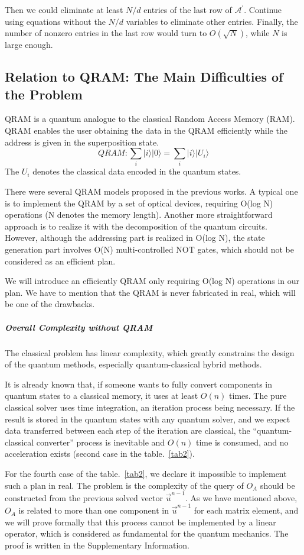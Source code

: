 \documentclass[%
 reprint,
 amsmath,amssymb,
pra,
]{revtex4-1}
\begin{document}
\begin{itemize}
Then we could eliminate at least $N/d$ entries of the last row of $\mathcal{A^{\prime}}$. Continue using equations without the $N/d$ variables to eliminate other entries. Finally, the number of nonzero entries in the last row would turn to $O(\sqrt{N})$, while $N$ is large enough.
\fi


\subsection{Relation to QRAM: The Main Difficulties of the Problem}

QRAM is a quantum analogue to the classical Random Access Memory (RAM). QRAM enables the user obtaining the data in the QRAM efficiently while the address is given in the superposition state. 
$$
QRAM: \sum_i{|i\rangle|0\rangle}=\sum_i{|i\rangle|U_i\rangle}
$$
The $U_i$ denotes the classical data encoded in the quantum states.

There were several QRAM models proposed in the previous works. A typical one is to implement the QRAM by a set of optical devices, requiring O(log N) operations (N denotes the memory length). Another more straightforward approach is to realize it with the decomposition of the quantum circuits. However, although the addressing part is realized in O(log N), the state generation part involves O(N) multi-controlled NOT gates, which should not be considered as an efficient plan.

We will introduce an efficiently QRAM only requiring O(log N) operations in our plan. We have to mention that the QRAM is never fabricated in real, which will be one of the drawbacks.

\subparagraph{Overall Complexity without QRAM} The classical problem has linear complexity, which greatly constrains the design of the quantum methods, especially quantum-classical hybrid methods. 

It is already known that, if someone wants to fully convert components in quantum states to a classical memory, it uses at least $O(n)$ times. The pure classical solver uses time integration, an iteration process being necessary. If the result is stored in the quantum states with any quantum solver, and we expect data transferred between each step of the iteration are classical, the “quantum-classical converter” process is inevitable and $O(n)$ time is consumed, and no acceleration exists (second case in the table.~\ref{tab2}).

For the fourth case of the table.~\ref{tab2}, we declare it impossible to implement such a plan in real. The problem is the complexity of the query of $O_A$ should be constructed from the previous solved vector $\vec{u}^{n-1}$. As we have mentioned above, $O_A$ is related to more than one component in $\vec{u}^{n-1}$ for each matrix element, and we will prove formally that this process cannot be implemented by a linear operator, which is considered as fundamental for the quantum mechanics. The proof is written in the Supplementary Information.


\end{itemize}
\end{document}
